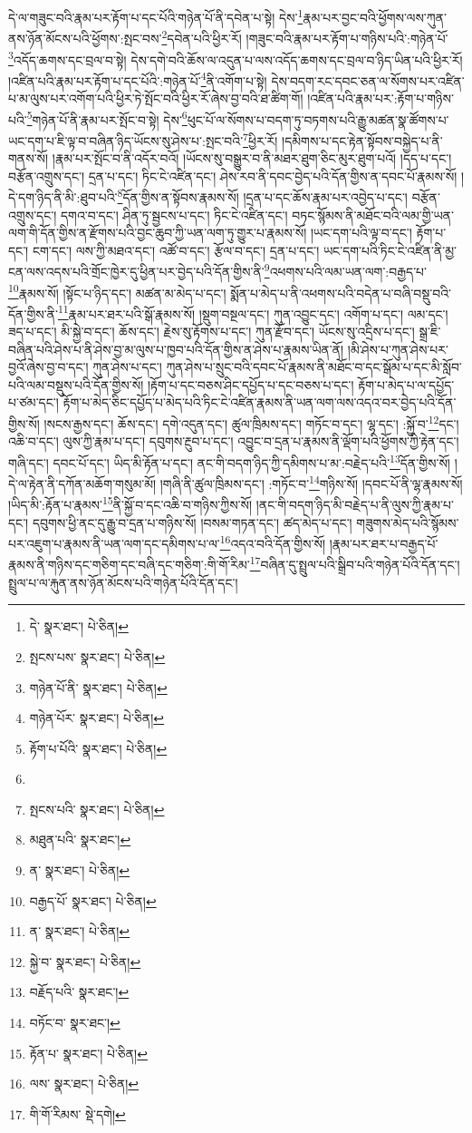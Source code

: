 དེ་ལ་གཟུང་བའི་རྣམ་པར་རྟོག་པ་དང་པོའི་གཉེན་པོ་ནི་དབེན་པ་སྟེ། དེས་\footnote{དེ་  སྣར་ཐང་།  པེ་ཅིན། }རྣམ་པར་བྱང་བའི་ཕྱོགས་ལས་ཀུན་ནས་ཉོན་མོངས་པའི་ཕྱོགས་:སྤང་བས་\footnote{སྤངས་པས་  སྣར་ཐང་།  པེ་ཅིན། }དབེན་པའི་ཕྱིར་རོ། །གཟུང་བའི་རྣམ་པར་རྟོག་པ་གཉིས་པའི་:གཉེན་པོ་\footnote{གཉེན་པོ་ནི་  སྣར་ཐང་།  པེ་ཅིན། }འདོད་ཆགས་དང་བྲལ་བ་སྟེ། དེས་དགེ་བའི་ཆོས་ལ་འདུན་པ་ལས་འདོད་ཆགས་དང་བྲལ་བ་ཉིད་ཡིན་པའི་ཕྱིར་རོ། །འཛིན་པའི་རྣམ་པར་རྟོག་པ་དང་པོའི་:གཉེན་པོ་\footnote{གཉེན་པོར་  སྣར་ཐང་།  པེ་ཅིན། }ནི་འགོག་པ་སྟེ། དེས་བདག་རང་དབང་ཅན་ལ་སོགས་པར་འཛིན་པ་མ་ལུས་པར་འགོག་པའི་ཕྱིར་ཏེ་སྤོང་བའི་ཕྱིར་རོ་ཞེས་བྱ་བའི་ཐ་ཚིག་གོ། །འཛིན་པའི་རྣམ་པར་:རྟོག་པ་གཉིས་པའི་\footnote{རྟོག་པ་པོའི་  སྣར་ཐང་།  པེ་ཅིན། }གཉེན་པོ་ནི་རྣམ་པར་སྤོང་བ་སྟེ། དེས་\footnote{}ཕུང་པོ་ལ་སོགས་པ་བདག་ཏུ་བཏགས་པའི་རྒྱུ་མཚན་སྣ་ཚོགས་པ་ཡང་དག་པ་ཇི་ལྟ་བ་བཞིན་ཉིད་ཡོངས་སུ་ཤེས་པ་:སྤང་བའི་\footnote{སྤངས་པའི་  སྣར་ཐང་།  པེ་ཅིན། }ཕྱིར་རོ། །དམིགས་པ་དང་རྟེན་སྟོབས་བསྐྱེད་པ་ནི་གནས་སོ། །རྣམ་པར་སྤོང་བ་ནི་འདོར་བའོ། །ཡོངས་སུ་བསྒྱུར་བ་ནི་མཐར་ཐུག་ཅིང་མུར་ཐུག་པའོ། །དད་པ་དང་། བརྩོན་འགྲུས་དང་། དྲན་པ་དང་། ཏིང་ངེ་འཛིན་དང་། ཤེས་རབ་ནི་དབང་བྱེད་པའི་དོན་གྱིས་ན་དབང་པོ་རྣམས་སོ། །དེ་དག་ཉིད་ནི་མི་:ཐུབ་པའི་\footnote{མཐུན་པའི་  སྣར་ཐང་། }དོན་གྱིས་ན་སྟོབས་རྣམས་སོ། །དྲན་པ་དང་ཆོས་རྣམ་པར་འབྱེད་པ་དང་། བརྩོན་འགྲུས་དང་། དགའ་བ་དང་། ཤིན་ཏུ་སྦྱངས་པ་དང་། ཏིང་ངེ་འཛིན་དང་། བཏང་སྙོམས་ནི་མཐོང་བའི་ལམ་གྱི་ཡན་ལག་གི་དོན་གྱིས་ན་རྫོགས་པའི་བྱང་ཆུབ་ཀྱི་ཡན་ལག་ཏུ་གྱུར་པ་རྣམས་སོ། །ཡང་དག་པའི་ལྟ་བ་དང་། རྟོག་པ་དང་། ངག་དང་། ལས་ཀྱི་མཐའ་དང་། འཚོ་བ་དང་། རྩོལ་བ་དང་། དྲན་པ་དང་། ཡང་དག་པའི་ཏིང་ངེ་འཛིན་ནི་མྱ་ངན་ལས་འདས་པའི་གྲོང་ཁྱེར་དུ་ཕྱིན་པར་བྱེད་པའི་དོན་གྱིས་ནི་\footnote{ན་  སྣར་ཐང་།  པེ་ཅིན། }འཕགས་པའི་ལམ་ཡན་ལག་:བརྒྱད་པ་\footnote{བརྒྱད་པོ་  སྣར་ཐང་།  པེ་ཅིན། }རྣམས་སོ། །སྟོང་པ་ཉིད་དང་། མཚན་མ་མེད་པ་དང་། སྨོན་པ་མེད་པ་ནི་འཕགས་པའི་བདེན་པ་བཞི་བསྡུ་བའི་དོན་གྱིས་ནི་\footnote{ན་  སྣར་ཐང་།  པེ་ཅིན། }རྣམ་པར་ཐར་པའི་སྒོ་རྣམས་སོ། །སྡུག་བསྔལ་དང་། ཀུན་འབྱུང་དང་། འགོག་པ་དང་། ལམ་དང་། ཟད་པ་དང་། མི་སྐྱེ་བ་དང་། ཆོས་དང་། རྗེས་སུ་རྟོགས་པ་དང་། ཀུན་རྫོབ་དང་། ཡོངས་སུ་འདྲིས་པ་དང་། སྒྲ་ཇི་བཞིན་པའི་ཤེས་པ་ནི་ཤེས་བྱ་མ་ལུས་པ་ཁྱབ་པའི་དོན་གྱིས་ན་ཤེས་པ་རྣམས་ཡིན་ནོ། །མི་ཤེས་པ་ཀུན་ཤེས་པར་བྱའོ་ཞེས་བྱ་བ་དང་། ཀུན་ཤེས་པ་དང་། ཀུན་ཤེས་པ་སྲུང་བའི་དབང་པོ་རྣམས་ནི་མཐོང་བ་དང་སྒོམ་པ་དང་མི་སློབ་པའི་ལམ་བསྡུས་པའི་དོན་གྱིས་སོ། །རྟོག་པ་དང་བཅས་ཤིང་དཔྱོད་པ་དང་བཅས་པ་དང་། རྟོག་པ་མེད་པ་ལ་དཔྱོད་པ་ཙམ་དང་། རྟོག་པ་མེད་ཅིང་དཔྱོད་པ་མེད་པའི་ཏིང་ངེ་འཛིན་རྣམས་ནི་ཡན་ལག་ལས་འདའ་བར་བྱེད་པའི་དོན་གྱིས་སོ། །སངས་རྒྱས་དང་། ཆོས་དང་། དགེ་འདུན་དང་། ཚུལ་ཁྲིམས་དང་། གཏོང་བ་དང་། ལྷ་དང་། :སྐྱོ་བ་\footnote{སྐྱེ་བ་  སྣར་ཐང་།  པེ་ཅིན། }དང་། འཆི་བ་དང་། ལུས་ཀྱི་རྣམ་པ་དང་། དབུགས་རྔུབ་པ་དང་། འབྱུང་བ་དྲན་པ་རྣམས་ནི་ལྡོག་པའི་ཕྱོགས་ཀྱི་རྟེན་དང་། གཞི་དང་། དབང་པོ་དང་། ཡིད་མི་རྟོན་པ་དང་། ནང་གི་བདག་ཉིད་ཀྱི་དམིགས་པ་མ་:བརྗེད་པའི་\footnote{བརྗོད་པའི་  སྣར་ཐང་། }དོན་གྱིས་སོ། །དེ་ལ་རྟེན་ནི་དཀོན་མཆོག་གསུམ་མོ། །གཞི་ནི་ཚུལ་ཁྲིམས་དང་། :གཏོང་བ་\footnote{བཏོང་བ་  སྣར་ཐང་། }གཉིས་སོ། །དབང་པོ་ནི་ལྷ་རྣམས་སོ། །ཡིད་མི་:རྟོན་པ་རྣམས་\footnote{རྟོན་པ་  སྣར་ཐང་།  པེ་ཅིན། }ནི་སྐྱོ་བ་དང་འཆི་བ་གཉིས་ཀྱིས་སོ། །ནང་གི་བདག་ཉིད་མི་བརྗེད་པ་ནི་ལུས་ཀྱི་རྣམ་པ་དང་། དབུགས་ཕྱི་ནང་དུ་རྒྱུ་བ་དྲན་པ་གཉིས་སོ། །བསམ་གཏན་དང་། ཚད་མེད་པ་དང་། གཟུགས་མེད་པའི་སྙོམས་པར་འཇུག་པ་རྣམས་ནི་ཡན་ལག་དང་དམིགས་པ་ལ་\footnote{ལས་  སྣར་ཐང་།  པེ་ཅིན། }འདའ་བའི་དོན་གྱིས་སོ། །རྣམ་པར་ཐར་པ་བརྒྱད་པོ་རྣམས་ནི་གཉིས་དང་གཅིག་དང་བཞི་དང་གཅིག་:གི་གོ་རིམ་\footnote{གི་གོ་རིམས་  སྡེ་དགེ། }བཞིན་དུ་སྤྲུལ་པའི་སྒྲིབ་པའི་གཉེན་པོའི་དོན་དང་། སྤྲུལ་པ་ལ་རྐུན་ནས་ཉོན་མོངས་པའི་གཉེན་པོའི་དོན་དང་། 